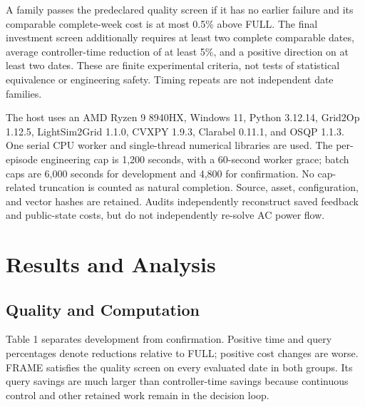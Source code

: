 A family passes the predeclared quality screen if it has no earlier failure and its comparable complete-week cost is at most 0.5\% above FULL. The final investment screen additionally requires at least two complete comparable dates, average controller-time reduction of at least 5\%, and a positive direction on at least two dates. These are finite experimental criteria, not tests of statistical equivalence or engineering safety. Timing repeats are not independent date families.


The host uses an AMD Ryzen 9 8940HX, Windows 11, Python 3.12.14, Grid2Op 1.12.5, LightSim2Grid 1.1.0, CVXPY 1.9.3, Clarabel 0.11.1, and OSQP 1.1.3. One serial CPU worker and single-thread numerical libraries are used. The per-episode engineering cap is 1,200 seconds, with a 60-second worker grace; batch caps are 6,000 seconds for development and 4,800 for confirmation. No cap-related truncation is counted as natural completion. Source, asset, configuration, and vector hashes are retained. Audits independently reconstruct saved feedback and public-state costs, but do not independently re-solve AC power flow.


\section{Results and Analysis}

\subsection{Quality and Computation}

Table 1 separates development from confirmation. Positive time and query percentages denote reductions relative to FULL; positive cost changes are worse. FRAME satisfies the quality screen on every evaluated date in both groups. Its query savings are much larger than controller-time savings because continuous control and other retained work remain in the decision loop.


